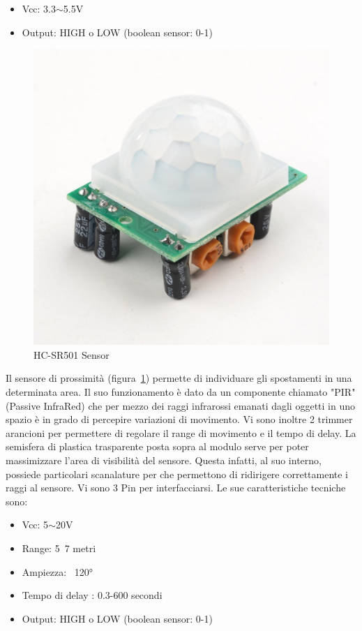 \begin{itemize}
	\item Vcc: 3.3$\sim$5.5V
	\item Output: HIGH o LOW (boolean sensor: 0-1)
\end{itemize}

\newpage



\begin{figure}
	\centering
	\includegraphics[width=0.7\linewidth]{Figures/Sensors&Rasp/pir}
	\caption[PIR] {HC-SR501 Sensor}
	\label{fig:pir}

\end{figure}



Il sensore di prossimità (figura~\ref{fig:pir}) permette di individuare gli spostamenti in una determinata area. Il suo funzionamento è dato da un componente chiamato "PIR" (Passive InfraRed) che per mezzo dei raggi infrarossi emanati dagli oggetti in uno spazio è in grado di percepire variazioni di movimento. Vi sono inoltre 2 trimmer arancioni per permettere di regolare il range di movimento e il tempo di delay. La semisfera di plastica trasparente posta sopra al modulo serve per poter massimizzare l'area di visibilità del sensore. Questa infatti, al suo interno, possiede particolari scanalature per che permettono di ridirigere correttamente i raggi al sensore. Vi sono 3 Pin per interfacciarsi.
Le sue caratteristiche tecniche sono:

\begin{itemize}
	\item Vcc: 5$\sim$20V
	\item Range: 5~7 metri
	\item Ampiezza: ~120°
	\item Tempo di delay : 0.3-600 secondi
	\item Output: HIGH o LOW (boolean sensor: 0-1)
\end{itemize}


